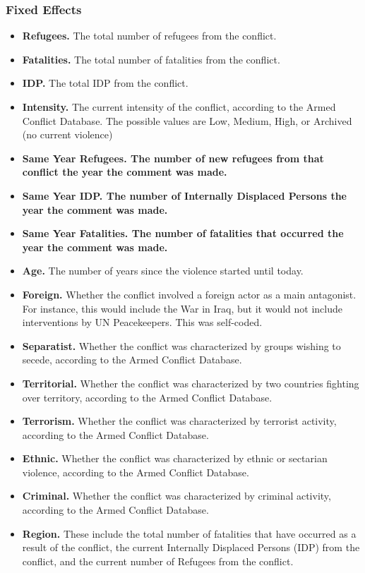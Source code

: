 \subsubsection{Fixed Effects}
\begin{itemize}
\item{\textbf{Refugees.} The total number of refugees from the conflict.}
\item{\textbf{Fatalities.} The total number of fatalities from the conflict.}
\item{\textbf{IDP.} The total IDP from the conflict.}
\item{\textbf{Intensity.} The current intensity of the conflict, according to the Armed Conflict Database. The possible values are Low, Medium, High, or Archived (no current violence)}
\item{\textbf{Same Year Refugees. The number of new refugees from that conflict the year the comment was made.}}
\item{\textbf{Same Year IDP. The number of Internally Displaced Persons the year the comment was made.}}
\item{\textbf{Same Year Fatalities. The number of fatalities that occurred the year the comment was made. }}
\item{\textbf{Age.} The number of years since the violence started until today.}
\item{\textbf{Foreign.} Whether the conflict involved a foreign actor as a main antagonist. For instance, this would include the War in Iraq, but it would not include interventions by UN Peacekeepers. This was self-coded.}
\item{\textbf{Separatist.} Whether the conflict was characterized by groups wishing to secede, according to the Armed Conflict Database.}
\item{\textbf{Territorial.} Whether the conflict was characterized by two countries fighting over territory, according to the Armed Conflict Database.}
\item{\textbf{Terrorism.} Whether the conflict was characterized by terrorist activity, according to the Armed Conflict Database.}
\item{\textbf{Ethnic.} Whether the conflict was characterized by ethnic or sectarian violence, according to the Armed Conflict Database.}
\item{\textbf{Criminal.} Whether the conflict was characterized by criminal activity, according to the Armed Conflict Database.}
\item{\textbf{Region.} These include the total number of fatalities that have occurred as a result of the conflict, the current Internally Displaced Persons (IDP) from the conflict, and the current number of Refugees from the conflict.}
\end{itemize} 

